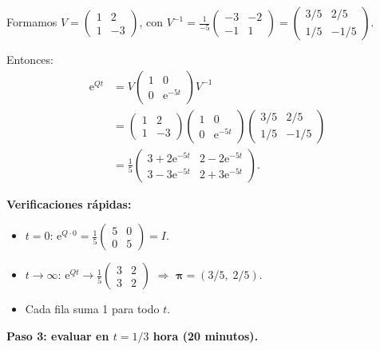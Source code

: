 \documentclass[11pt,a4paper]{article}
\theoremstyle{definition}
\theoremstyle{remark}
\newcommand{\e}{\mathrm{e}}
\begin{document}
\begin{ejemplo}
Formamos $V = \begin{pmatrix}1&2\\1&-3\end{pmatrix}$, con
$V^{-1} = \frac{1}{-5}\begin{pmatrix}-3&-2\\-1&1\end{pmatrix}
= \begin{pmatrix}3/5&2/5\\1/5&-1/5\end{pmatrix}$.

Entonces:
\begin{align*}
  \e^{Qt} &= V\begin{pmatrix}1&0\\0&\e^{-5t}\end{pmatrix}V^{-1} \\
  &= \begin{pmatrix}1&2\\1&-3\end{pmatrix}
     \begin{pmatrix}1&0\\0&\e^{-5t}\end{pmatrix}
     \begin{pmatrix}3/5&2/5\\1/5&-1/5\end{pmatrix} \\
  &= \frac{1}{5}\begin{pmatrix}
       3+2\e^{-5t} & 2-2\e^{-5t} \\
       3-3\e^{-5t} & 2+3\e^{-5t}
     \end{pmatrix}.
\end{align*}

\textbf{Verificaciones rápidas:}
\begin{itemize}[nosep]
  \item $t=0$: $\e^{Q\cdot 0}=\frac{1}{5}\begin{pmatrix}5&0\\0&5\end{pmatrix}=I$. \checkmark
  \item $t\to\infty$: $\e^{Qt}\to\frac{1}{5}\begin{pmatrix}3&2\\3&2\end{pmatrix}$
    $\Rightarrow$ $\boldsymbol{\pi}=(3/5,\;2/5)$. \checkmark
  \item Cada fila suma 1 para todo $t$. \checkmark
\end{itemize}

\textbf{Paso 3: evaluar en $t = 1/3$ hora (20 minutos).}


\end{ejemplo}
\end{document}
